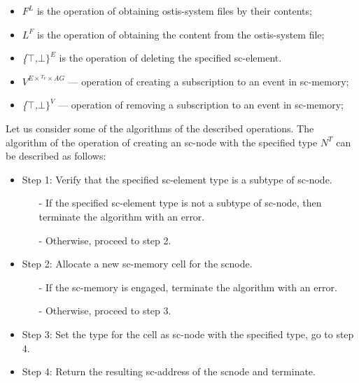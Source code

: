 \documentclass{article}
\begin{document}
\begin{multicols}{2}
\begin{itemize}
\item{\textit{$F^L$}}
 is the operation of obtaining ostis-system files
by their contents;
\item{\textit{$L^F$}}
is the operation of obtaining the content from
the ostis-system file;

\item{\textit{\{$\top$\textit{,}$\bot$\textit{$\}^E$}}}
is the operation of deleting the specified
sc-element.

\item{\textit{$V^{E\times{^{T_V}}\times{{AG}}}$}}
— operation of creating a subscription
to an event in sc-memory;

\item{\textit{\{$\top$\textit{,}$\bot$\textit{$\}^V$}}}
— operation of removing a subscription
to an event in sc-memory;

 \end{itemize}
 Let us consider some of the algorithms of the described operations. The algorithm of the operation of
creating an sc-node with the specified type \textit{$N^T$} can be
described as follows:

\begin{itemize}
\itemsep=0mm
\item Step 1: Verify that the specified sc-element type is
a subtype of sc-node.

\begin{itemize}
\itemsep=0mm
\item[-]If the specified sc-element type is not a subtype
of sc-node, then terminate the algorithm with an
error.

\item[-]Otherwise, proceed to step 2.
\end{itemize}

\item Step 2: Allocate a new sc-memory cell for the scnode.


\begin{itemize}
\itemsep=0mm
\item[-]If the sc-memory is engaged, terminate the algorithm with an error.

\item[-]Otherwise, proceed to step 3.
\end{itemize}
\end{itemize}

\begin{itemize}
\itemsep=0mm
\item Step 3: Set the type for the cell as sc-node with the
specified type, go to step 4.
\item Step 4: Return the resulting sc-address of the scnode and terminate.
\end{itemize}


\end{multicols}
\end{document}
